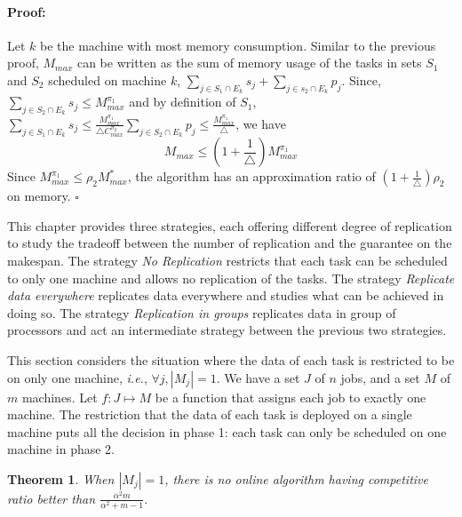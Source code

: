 \documentclass[12pt]{article}
\theoremstyle{mystyle}
\newtheorem{theorem}{Theorem}
\newenvironment{myproof}{\paragraph{Proof:}}{\hfill$\square$}
\begin{document}
     \begin{myproof}
     Let $k $ be the machine with most memory consumption.  Similar to the previous proof, $M_{max}$ can be written as the sum of memory usage of the tasks in sets $S_1$ and $S_2$ scheduled on machine $k$, $\sum\limits
     _{j \in S_1 \cap E_k}^{}s_j+\sum\limits_{j \in s_2 \cap E_k}^{}p_j $. Since,  $\sum\limits
        _{j \in S_2 \cap E_k}^{}s_j\leq {M}^{\pi_1}_{max}$ and by definition of $ S_1$, $\sum\limits
              _{j \in S_1 \cap E_k}^{}s_j\leq \frac{{M}^{\pi_1}_{max}}{\triangle C^{\pi_2}_{max}}\sum\limits _{j \in S_2\cap E_k} p_j \leq  \frac{{M}^{\pi_1}_{max}}{\triangle }$, we have
             \begin{equation}\nonumber                     M_{max}\leq(1+\frac{1}{\triangle}){M}^{\pi_1}_{max}                         \end{equation}
         Since ${M}^{\pi_1}_{max} \leq \rho_2 {M}^{*}_{max}$, the algorithm has an approximation ratio of $ (1+\frac{1}{\triangle})  \rho_2$ on memory.
                                 \end{myproof}
                             
   \label{ch4}
   
   This chapter provides three strategies,  each offering different degree of replication to study the tradeoff between the number of replication and the guarantee on the makespan.  The strategy \textit{No Replication} restricts that each task can be scheduled to only one machine and  allows no replication of the tasks.  The strategy \textit{Replicate data everywhere} replicates data everywhere and studies what can be achieved in doing so. The strategy \textit{Replication in groups} replicates data in group of  processors and  act an intermediate strategy  between the previous two strategies. 
   
   
   This section considers the situation where the data of each task is
   restricted to be on only one machine, {\em i.e.}, $\forall j, |M_j|=1$.  We
   have a set $J$ of $ n$ jobs, and a set $M$ of $m$ machines.  Let $f :
   J \mapsto M$ be a function that assigns each job to exactly one
   machine. The restriction that the data of each task is deployed on a
   single machine puts all the decision in phase 1: each task can only be
   scheduled on one machine in phase 2.
   
   \begin{theorem}
   \label{th:model1-lb}
     When $|M_j| = 1$, there is no online algorithm having competitive
     ratio better than $\frac{\alpha^{2}m }{\alpha^{2} + m-1}$.
   \end{theorem}
    
\end{document}
